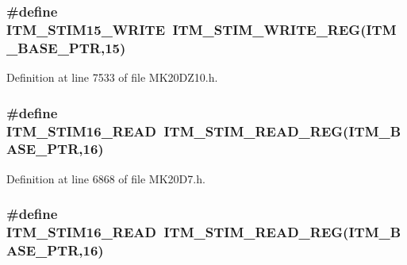 \subsubsection[{\texorpdfstring{I\+T\+M\+\_\+\+S\+T\+I\+M15\+\_\+\+W\+R\+I\+TE}{ITM_STIM15_WRITE}}]{\setlength{\rightskip}{0pt plus 5cm}\#define I\+T\+M\+\_\+\+S\+T\+I\+M15\+\_\+\+W\+R\+I\+TE~{\bf I\+T\+M\+\_\+\+S\+T\+I\+M\+\_\+\+W\+R\+I\+T\+E\+\_\+\+R\+EG}({\bf I\+T\+M\+\_\+\+B\+A\+S\+E\+\_\+\+P\+TR},15)}\hypertarget{group___i_t_m___register___accessor___macros_ga5363027769120ac7fd13164c60346eb1}{}\label{group___i_t_m___register___accessor___macros_ga5363027769120ac7fd13164c60346eb1}


Definition at line 7533 of file M\+K20\+D\+Z10.\+h.

\subsubsection[{\texorpdfstring{I\+T\+M\+\_\+\+S\+T\+I\+M16\+\_\+\+R\+E\+AD}{ITM_STIM16_READ}}]{\setlength{\rightskip}{0pt plus 5cm}\#define I\+T\+M\+\_\+\+S\+T\+I\+M16\+\_\+\+R\+E\+AD~{\bf I\+T\+M\+\_\+\+S\+T\+I\+M\+\_\+\+R\+E\+A\+D\+\_\+\+R\+EG}({\bf I\+T\+M\+\_\+\+B\+A\+S\+E\+\_\+\+P\+TR},16)}\hypertarget{group___i_t_m___register___accessor___macros_ga9036d1cfac0837b32666e7cb353cfd95}{}\label{group___i_t_m___register___accessor___macros_ga9036d1cfac0837b32666e7cb353cfd95}


Definition at line 6868 of file M\+K20\+D7.\+h.

\subsubsection[{\texorpdfstring{I\+T\+M\+\_\+\+S\+T\+I\+M16\+\_\+\+R\+E\+AD}{ITM_STIM16_READ}}]{\setlength{\rightskip}{0pt plus 5cm}\#define I\+T\+M\+\_\+\+S\+T\+I\+M16\+\_\+\+R\+E\+AD~{\bf I\+T\+M\+\_\+\+S\+T\+I\+M\+\_\+\+R\+E\+A\+D\+\_\+\+R\+EG}({\bf I\+T\+M\+\_\+\+B\+A\+S\+E\+\_\+\+P\+TR},16)}\hypertarget{group___i_t_m___register___accessor___macros_ga9036d1cfac0837b32666e7cb353cfd95}{}\label{group___i_t_m___register___accessor___macros_ga9036d1cfac0837b32666e7cb353cfd95}


